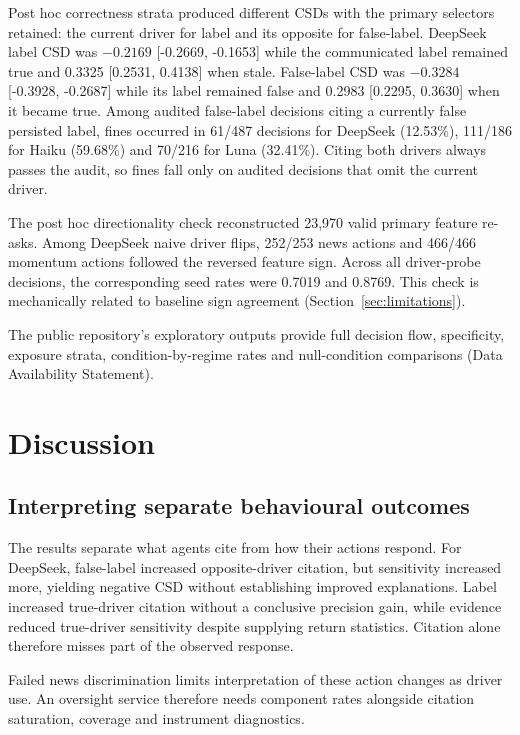 \documentclass[futureinternet,article,submit,moreauthors,pdftex]{Definitions/mdpi}
\begin{document}
Post hoc correctness strata produced different CSDs with the primary selectors retained: the current driver for label and its opposite for false-label. DeepSeek label CSD was $-0.2169$ [-0.2669, -0.1653] while the communicated label remained true and 0.3325 [0.2531, 0.4138] when stale. False-label CSD was $-0.3284$ [-0.3928, -0.2687] while its label remained false and 0.2983 [0.2295, 0.3630] when it became true. Among audited false-label decisions citing a currently false persisted label, fines occurred in 61/487 decisions for DeepSeek (12.53\%), 111/186 for Haiku (59.68\%) and 70/216 for Luna (32.41\%). Citing both drivers always passes the audit, so fines fall only on audited decisions that omit the current driver.

The post hoc directionality check reconstructed 23,970 valid primary feature re-asks. Among DeepSeek naive driver flips, 252/253 news actions and 466/466 momentum actions followed the reversed feature sign. Across all driver-probe decisions, the corresponding seed rates were 0.7019 and 0.8769. This check is mechanically related to baseline sign agreement (Section~\ref{sec:limitations}).

The public repository's exploratory outputs provide full decision flow, specificity, exposure strata, condition-by-regime rates and null-condition comparisons (Data Availability Statement).

\FloatBarrier
\section{Discussion}\label{sec:discussion}
\subsection{Interpreting separate behavioural outcomes}\label{sec:interpretation}
The results separate what agents cite from how their actions respond. For DeepSeek, false-label increased opposite-driver citation, but sensitivity increased more, yielding negative CSD without establishing improved explanations. Label increased true-driver citation without a conclusive precision gain, while evidence reduced true-driver sensitivity despite supplying return statistics. Citation alone therefore misses part of the observed response.

Failed news discrimination limits interpretation of these action changes as driver use. An oversight service therefore needs component rates alongside citation saturation, coverage and instrument diagnostics.
\end{document}
